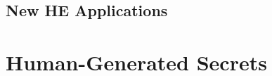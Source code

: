 \documentclass[10pt]{article}
\begin{document}
\subsection{New HE Applications}

\section{Human-Generated Secrets}



 









\clearpage
\renewcommand{\thepage}{M-\arabic{page}}
\setcounter{page}{1}



\clearpage
\renewcommand{\thepage}{R-\arabic{page}}
\setcounter{page}{1}

%

\end{document}
